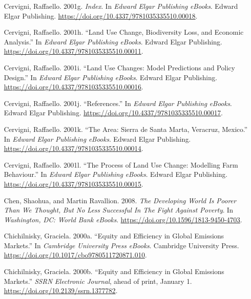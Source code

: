 \begin{CSLReferences}{1}{1}
Cervigni, Raffaello. 2001g. \emph{Index}. In \emph{Edward Elgar
Publishing eBooks}. Edward Elgar Publishing.
\url{https://doi.org/10.4337/9781035335510.00018}.

Cervigni, Raffaello. 2001h. {``Land Use Change, Biodiversity Loss, and
Economic Analysis.''} In \emph{Edward Elgar Publishing eBooks}. Edward
Elgar Publishing. \url{https://doi.org/10.4337/9781035335510.00011}.

Cervigni, Raffaello. 2001i. {``Land Use Changes: Model Predictions and
Policy Design.''} In \emph{Edward Elgar Publishing eBooks}. Edward Elgar
Publishing. \url{https://doi.org/10.4337/9781035335510.00016}.

Cervigni, Raffaello. 2001j. {``References.''} In \emph{Edward Elgar
Publishing eBooks}. Edward Elgar Publishing.
\url{https://doi.org/10.4337/9781035335510.00017}.

Cervigni, Raffaello. 2001k. {``The Area: Sierra de Santa Marta,
Veracruz, Mexico.''} In \emph{Edward Elgar Publishing eBooks}. Edward
Elgar Publishing. \url{https://doi.org/10.4337/9781035335510.00014}.

Cervigni, Raffaello. 2001l. {``The Process of Land Use Change: Modelling
Farm Behaviour.''} In \emph{Edward Elgar Publishing eBooks}. Edward
Elgar Publishing. \url{https://doi.org/10.4337/9781035335510.00015}.

Chen, Shaohua, and Martin Ravallion. 2008. \emph{The Developing World Is
Poorer Than We Thought, But No Less Successful In The Fight Against
Poverty}. In \emph{Washington, DC: World Bank eBooks}.
\url{https://doi.org/10.1596/1813-9450-4703}.

Chichilnisky, Graciela. 2000a. {``Equity and Efficiency in Global
Emissions Markets.''} In \emph{Cambridge University Press eBooks}.
Cambridge University Press.
\url{https://doi.org/10.1017/cbo9780511720871.010}.

Chichilnisky, Graciela. 2000b. {``Equity and Efficiency in Global
Emissions Markets.''} \emph{SSRN Electronic Journal}, ahead of print,
January 1. \url{https://doi.org/10.2139/ssrn.1377782}.


\end{CSLReferences}

